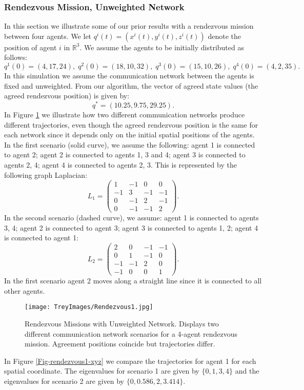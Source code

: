 \documentclass{aims}
\theoremstyle{definition}
\begin{document}
\subsubsection{Rendezvous Mission, Unweighted Network}
\label{sectionredezvous1}
In this section we illustrate some of our prior results with a rendezvous mission between four agents.  We let $q^i(t)=(x^i(t),y^i(t),z^i(t))$ denote the position of agent $i$ in $\mathbb{R}^3$. We assume the agents to be initially distributed as follows:
\begin{equation*}
    q^1(0)=(4,17,24),\;q^2(0)=(18,10,32),\; q^3(0)=(15,10,26),\;q^4(0)=(4,2,35).
\end{equation*}
In this simulation we assume the communication network between the agents is fixed and unweighted. From our algorithm, the vector of agreed state values (the agreed rendezvous position) is given by:
\begin{equation}
    q^*=(10.25,9.75,29.25).
\end{equation}
In Figure \ref{Fig-rendezvous1} we illustrate how two different communication networks produce different trajectories, even though the agreed rendezvous position is the same for each network since it depends only on the initial spatial positions of the agents. In the first scenario (solid curve), we assume the following: agent 1 is connected to agent 2; agent 2 is connected to agents 1, 3 and 4; agent 3 is connected to agents 2, 4; agent 4 is connected to agents 2, 3. This is represented by the following graph Laplacian:
\begin{equation}
    L_1=\left(\begin{array}{cccc}1&-1&0&0\\-1&3&-1&-1\\0&-1&2&-1\\0&-1&-1&2\end{array}\right).
\end{equation}
In the second scenario (dashed curve), we assume: agent 1 is connected to agents 3, 4; agent 2 is connected to agent 3; agent 3 is connected to agents 1, 2; agent 4 is connected to agent 1:
\begin{equation}
    L_2=\left(\begin{array}{cccc}2&0&-1&-1\\0&1&-1&0\\-1&-1&2&0\\-1&0&0&1\end{array}\right).
\end{equation}
In the first scenario agent 2 moves along a straight line since it is connected to all other agents. 
\begin{figure}[h!]
\texttt{[image: TreyImages/Rendezvous1.jpg]}
\caption{Rendezvous Missions with Unweighted Network. Displays two different communication network scenarios for a 4-agent rendezvous mission. Agreement positions coincide but trajectories differ.}
\label{Fig-rendezvous1}
\end{figure}
In Figure \ref{Fig-rendezvous1-xyz} we compare the trajectories for agent 1 for each spatial coordinate. The eigenvalues for scenario 1 are given by $\{0,1,3,4\}$ and the eigenvalues for scenario 2 are given by $\{0,0.586,2,3.414\}$.
\end{document}
